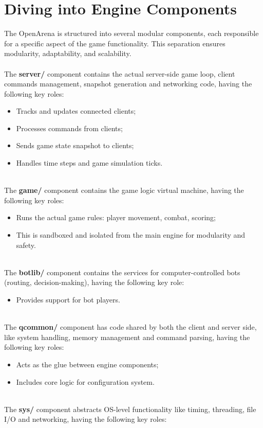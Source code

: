 \section{Diving into Engine Components}
The OpenArena is structured into several modular components, each responsible for a specific aspect of the game functionality.
This separation ensures modularity, adaptability, and scalability. \\ \\ 
The \textbf{server/} component contains the actual server-side game loop, client commands management, snapshot generation and networking code, having the following key roles:
\begin{itemize}
    \item Tracks and updates connected clients;
    \item Processes commands from clients;
    \item Sends game state snapshot to clients;
    \item Handles time steps and game simulation ticks.
\end{itemize} \\
The \textbf{game/} component contains the game logic virtual machine, having the following key roles:
\begin{itemize}
    \item Runs the actual game rules: player movement, combat, scoring;
    \item This is sandboxed and isolated from the main engine for modularity and safety.
\end{itemize} \\
The \textbf{botlib/} component contains the services for computer-controlled bots (routing, decision-making), having the following key role:
\begin{itemize}
    \item Provides support for bot players.
\end{itemize} \\
The \textbf{qcommon/} component has code shared by both the client and server side, like system handling, memory management and command parsing, having the following key roles:
\begin{itemize}
    \item Acts as the glue between engine components;
    \item Includes core logic for configuration system.
\end{itemize} \\
The \textbf{sys/} component abstracts OS-level functionality like timing, threading, file I/O and networking, having the following key roles:
